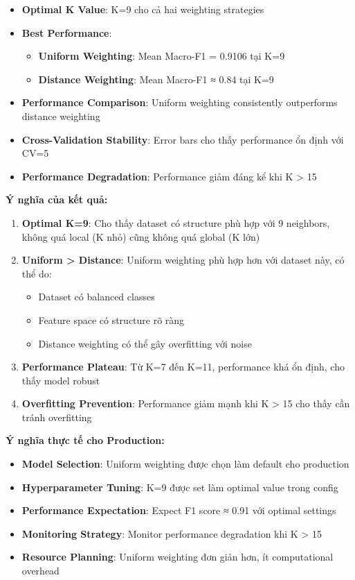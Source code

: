 \begin{itemize}
    \item \textbf{Optimal K Value}: K=9 cho cả hai weighting strategies
    \item \textbf{Best Performance}: 
        \begin{itemize}
            \item \textbf{Uniform Weighting}: Mean Macro-F1 = 0.9106 tại K=9
            \item \textbf{Distance Weighting}: Mean Macro-F1 ≈ 0.84 tại K=9
        \end{itemize}
    \item \textbf{Performance Comparison}: Uniform weighting consistently outperforms distance weighting
    \item \textbf{Cross-Validation Stability}: Error bars cho thấy performance ổn định với CV=5
    \item \textbf{Performance Degradation}: Performance giảm đáng kể khi K > 15
\end{itemize}

\textbf{Ý nghĩa của kết quả:}

\begin{enumerate}
    \item \textbf{Optimal K=9}: Cho thấy dataset có structure phù hợp với 9 neighbors, không quá local (K nhỏ) cũng không quá global (K lớn)
    \item \textbf{Uniform > Distance}: Uniform weighting phù hợp hơn với dataset này, có thể do:
        \begin{itemize}
            \item Dataset có balanced classes
            \item Feature space có structure rõ ràng
            \item Distance weighting có thể gây overfitting với noise
        \end{itemize}
    \item \textbf{Performance Plateau}: Từ K=7 đến K=11, performance khá ổn định, cho thấy model robust
    \item \textbf{Overfitting Prevention}: Performance giảm mạnh khi K > 15 cho thấy cần tránh overfitting
\end{enumerate}

\textbf{Ý nghĩa thực tế cho Production:}

\begin{itemize}
    \item \textbf{Model Selection}: Uniform weighting được chọn làm default cho production
    \item \textbf{Hyperparameter Tuning}: K=9 được set làm optimal value trong config
    \item \textbf{Performance Expectation}: Expect F1 score ≈ 0.91 với optimal settings
    \item \textbf{Monitoring Strategy}: Monitor performance degradation khi K > 15
    \item \textbf{Resource Planning}: Uniform weighting đơn giản hơn, ít computational overhead
\end{itemize}

